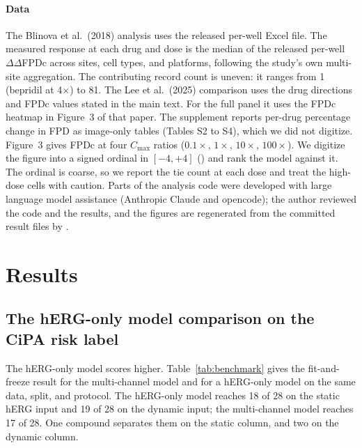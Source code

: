 \documentclass[preprint,12pt]{elsarticle}
\begin{document}
\paragraph{Data}
The Blinova et al.\ (2018) analysis uses the released per-well Excel file. The measured
response at each drug and dose is the median of the released per-well $\Delta\Delta$FPDc
across sites, cell types, and platforms, following the study's own multi-site
aggregation. The contributing record count is uneven: it ranges from 1 (bepridil at
4$\times$) to 81. The Lee et al.\ (2025) comparison uses the drug directions and FPDc
values stated in the main text. For the full panel it uses the FPDc heatmap in
Figure~3 of that paper. The supplement reports per-drug percentage change in FPD as
image-only tables (Tables S2 to S4), which we did not digitize. Figure~3 gives FPDc at
four $C_{\mathrm{max}}$ ratios ($0.1\times$, $1\times$, $10\times$, $100\times$). We
digitize the figure into a signed ordinal in $[-4,+4]$ () and
rank the model against it. The ordinal is coarse, so we report the tie count at each dose
and treat the high-dose cells with caution. Parts of the analysis code were developed with
large language model assistance (Anthropic Claude and opencode); the author reviewed the
code and the results, and the figures are regenerated from the committed result files by
.

\section{Results}\label{sec:results}

\subsection{The hERG-only model comparison on the CiPA risk label}

The hERG-only model scores higher. Table~\ref{tab:benchmark} gives the fit-and-freeze result for
the multi-channel model and for a hERG-only model on the same
data, split, and protocol. The hERG-only model reaches 18 of 28 on the static hERG input and 19 of
28 on the dynamic input; the multi-channel model reaches 17 of 28. One compound separates
them on the static column, and two on the dynamic column.
\end{document}
